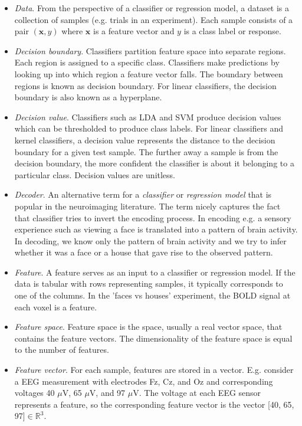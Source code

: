 \documentclass[utf8]{frontiersSCNS} %
\newcommand{\x}{\mathbf{x}}
\newcommand{\R}{\mathbb{R}}
\begin{document}
\begin{itemize}
\item \textit{Data}. From the perspective of a classifier or regression model, a dataset is a collection of samples (e.g. trials in an experiment). Each sample consists of a pair $(\x, y)$ where $\x$ is a feature vector and $y$ is a class label or response.
\item \textit{Decision boundary}. Classifiers partition feature space into separate regions. Each region is assigned to a specific class. Classifiers make predictions by looking up into which region a feature vector falls. The boundary between regions is known as decision boundary. For linear classifiers, the decision boundary is also known as a hyperplane.
\item \textit{Decision value}. Classifiers such as LDA and SVM produce decision values which can be thresholded to produce class labels. For linear classifiers and kernel classifiers, a decision value represents the distance to the decision boundary for a given test sample. The further away a sample is from the decision boundary, the more confident the classifier is about it belonging to a particular class. Decision values are unitless.
\item \textit{Decoder}. An alternative term for a \textit{classifier} or \textit{regression model} that is popular in the neuroimaging literature. The term nicely captures the fact that classifier tries to invert the encoding process. In encoding e.g. a sensory experience such as viewing a face is translated into a pattern of brain activity. In decoding, we know only the pattern of brain activity  and we try to infer whether it was a face or a house that gave rise to the observed pattern.
\item \textit{Feature}. A feature serves as an input to a classifier or regression model. If the data is tabular with rows representing samples, it typically corresponds to one of the columns. In the 'faces vs houses' experiment, the BOLD signal at each voxel is a feature.
\item \textit{Feature space}. Feature space is the space, usually a real vector space, that contains the feature vectors. The dimensionality of the feature space is equal to the number of features.
\item \textit{Feature vector}. For each sample, features are stored in a vector. E.g. consider a EEG measurement with electrodes Fz, Cz, and Oz and corresponding voltages 40 $\mu$V, 65 $\mu$V, and 97 $\mu$V. The voltage at each EEG sensor represents a feature, so the corresponding feature vector is the vector [40, 65, 97]$\in\R^3$.

\end{itemize}
\end{document}
